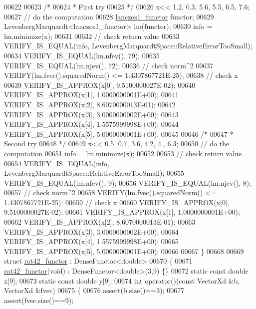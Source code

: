 \begin{DoxyCode}
00622 
00623   \textcolor{comment}{/*}
00624 \textcolor{comment}{   * First try}
00625 \textcolor{comment}{   */}
00626   x<< 1.2, 0.3, 5.6, 5.5, 6.5, 7.6;
00627   \textcolor{comment}{// do the computation}
00628   \hyperlink{structlanczos1__functor}{lanczos1\_functor} functor;
00629   LevenbergMarquardt<lanczos1\_functor> lm(functor);
00630   info = lm.minimize(x);
00631 
00632   \textcolor{comment}{// check return value}
00633   VERIFY\_IS\_EQUAL(info, LevenbergMarquardtSpace::RelativeErrorTooSmall);
00634   VERIFY\_IS\_EQUAL(lm.nfev(), 79);
00635   VERIFY\_IS\_EQUAL(lm.njev(), 72);
00636   \textcolor{comment}{// check norm^2}
00637   VERIFY(lm.fvec().squaredNorm() <= 1.4307867721E-25);
00638   \textcolor{comment}{// check x}
00639   VERIFY\_IS\_APPROX(x[0], 9.5100000027E-02);
00640   VERIFY\_IS\_APPROX(x[1], 1.0000000001E+00);
00641   VERIFY\_IS\_APPROX(x[2], 8.6070000013E-01);
00642   VERIFY\_IS\_APPROX(x[3], 3.0000000002E+00);
00643   VERIFY\_IS\_APPROX(x[4], 1.5575999998E+00);
00644   VERIFY\_IS\_APPROX(x[5], 5.0000000001E+00);
00645 
00646   \textcolor{comment}{/*}
00647 \textcolor{comment}{   * Second try}
00648 \textcolor{comment}{   */}
00649   x<< 0.5, 0.7, 3.6, 4.2, 4., 6.3;
00650   \textcolor{comment}{// do the computation}
00651   info = lm.minimize(x);
00652 
00653   \textcolor{comment}{// check return value}
00654   VERIFY\_IS\_EQUAL(info, LevenbergMarquardtSpace::RelativeErrorTooSmall);
00655   VERIFY\_IS\_EQUAL(lm.nfev(), 9);
00656   VERIFY\_IS\_EQUAL(lm.njev(), 8);
00657   \textcolor{comment}{// check norm^2}
00658   VERIFY(lm.fvec().squaredNorm() <= 1.4307867721E-25);
00659   \textcolor{comment}{// check x}
00660   VERIFY\_IS\_APPROX(x[0], 9.5100000027E-02);
00661   VERIFY\_IS\_APPROX(x[1], 1.0000000001E+00);
00662   VERIFY\_IS\_APPROX(x[2], 8.6070000013E-01);
00663   VERIFY\_IS\_APPROX(x[3], 3.0000000002E+00);
00664   VERIFY\_IS\_APPROX(x[4], 1.5575999998E+00);
00665   VERIFY\_IS\_APPROX(x[5], 5.0000000001E+00);
00666 
00667 \}
00668 
00669 \textcolor{keyword}{struct }\hyperlink{structrat42__functor}{rat42\_functor} : DenseFunctor<double>
00670 \{
00671     \hyperlink{structrat42__functor}{rat42\_functor}(\textcolor{keywordtype}{void}) : DenseFunctor<double>(3,9) \{\}
00672     \textcolor{keyword}{static} \textcolor{keyword}{const} \textcolor{keywordtype}{double} x[9];
00673     \textcolor{keyword}{static} \textcolor{keyword}{const} \textcolor{keywordtype}{double} y[9];
00674     \textcolor{keywordtype}{int} operator()(\textcolor{keyword}{const} VectorXd &b, VectorXd &fvec)
00675     \{
00676         assert(b.size()==3);
00677         assert(fvec.size()==9);

\end{DoxyCode}
